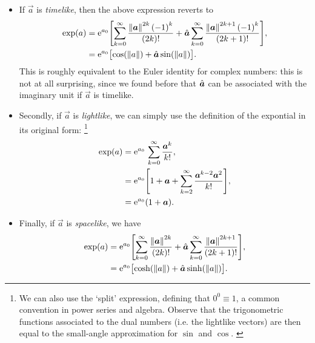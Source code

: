 \begin{itemize}
    \item If $\vec{a}$ is \emph{timelike}, then the above expression reverts to
        \begin{equation}
            \begin{split}
                \exp(a) &= \ec^{a_0}\qty[\sum_{k=0}^\infty \frac{\norm{\vec{a}}^{2k}\,\qty(-1)^k}{(2k)!} + \uvec{a}\sum_{k=0}^\infty \frac{\norm{\vec{a}}^{2k+1} \, \qty(-1)^k}{(2k+1)!}], \\
                        &= \ec^{a_0}\qty\big[\cos(\norm{a})  + \uvec{a}\sin(\norm{a})]. \\
            \end{split}
        \end{equation}
        This is roughly equivalent to the Euler identity for complex numbers: this is not at all surprising, since we found before that $\uvec{a}$ can be associated with the imaginary unit if $\vec{a}$ is timelike.
    \item Secondly, if $\vec{a}$ is \emph{lightlike}, we can simply use the definition of the expontial in its original form: \footnote{We can also use the `split' expression, defining that $0^0 \equiv 1$, a common convention in power series and algebra. Observe that the trigonometric functions associated to the dual numbers (i.e. the lightlike vectors) are then equal to the small-angle approximation for $\sin$ and $\cos$. \cite{Graham1994, Harkin2004}}
        \begin{equation}
            \begin{split}
                \exp(a) &= \ec^{a_0}\,\sum^{\infty}_{k=0} \frac{\vec{a}^k}{k!}, \\
                        &= \ec^{a_0}\qty[1 + \vec{a} + \sum^{\infty}_{k=2} \frac{\vec{a}^{k-2}\vec{a}^2}{k!}], \\
                        &= \ec^{a_0}\qty(1 + \vec{a}). \\
            \end{split}
        \end{equation}
    \item Finally, if $\vec{a}$ is \emph{spacelike}, we have
        \begin{equation}
            \begin{split}
                \exp(a) &= \ec^{a_0}\qty[\sum_{k=0}^\infty \frac{\norm{\vec{a}}^{2k}}{(2k)!} 
                           + \uvec{a}\sum_{k=0}^\infty \frac{\norm{\vec{a}}^{2k+1}}{(2k+1)!}], \\
                        &= \ec^{a_0}\qty\big[\cosh(\norm{a}) + \uvec{a}\sinh(\norm{a})]. \\
            \end{split}
        \end{equation}
\end{itemize}
